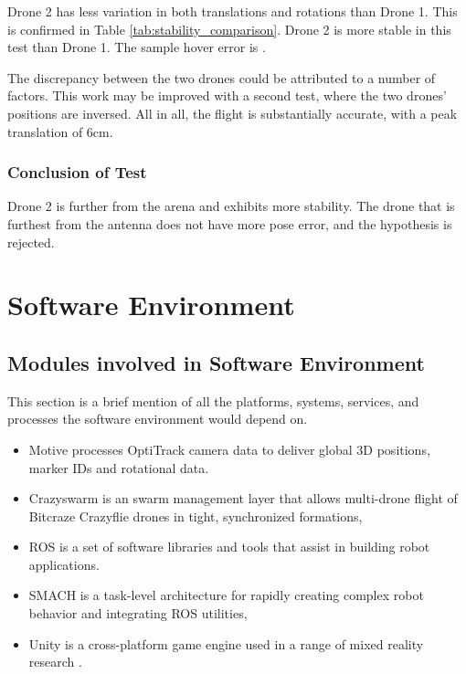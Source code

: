 Drone 2 has less variation in both translations and rotations than Drone 1. This is confirmed in Table \ref{tab:stability_comparison}. Drone 2 is more stable in this test than Drone 1. The sample hover error is .

The discrepancy between the two drones could be attributed to a number of factors.  This work may be improved with a second test, where the two drones' positions are inversed. All in all, the flight is substantially accurate, with a peak translation of 6cm.

\subsubsection{Conclusion of Test}
Drone 2 is further from the arena and exhibits more stability. The drone that is furthest from the antenna does not have more pose error, and the hypothesis is rejected.
\pagebreak
\section{Software Environment}\label{section:software}


\subsection{Modules involved in Software Environment}

This section is a brief mention of all the platforms, systems, services, and processes the software environment would depend on.

\begin{itemize}
    \item Motive \cite{optitrack} processes OptiTrack camera data to deliver global 3D positions, marker IDs and rotational data.
    \item Crazyswarm \cite{preiss_hönig_sukhatme_ayanian_2017} is an swarm management layer that allows multi-drone flight of Bitcraze Crazyflie drones in tight, synchronized formations,
    \item ROS \cite{ros} is a set of software libraries and tools that assist in building robot applications.
    \item SMACH \cite{smach} is a task-level architecture for rapidly creating complex robot behavior and integrating ROS utilities, 
    \item Unity \cite{unity3d} is a cross-platform game engine used in a range of mixed reality research \cite{mixed_reality_robotics}\cite{phan_hönig_ayanian_2018}\cite{rossharp}.
\end{itemize}

